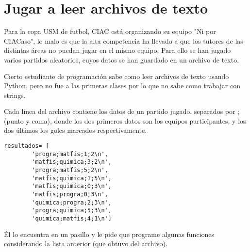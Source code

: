 \section{Jugar a leer archivos de texto}
Para la copa USM de futbol, CIAC está organizando su equipo "Ni por CIACaso", lo malo es que la alta competencia ha llevado a que los tutores de las distintas áreas no puedan jugar en el mismo equipo. Para ello se han jugado varios partidos aleatorios, cuyos datos se han guardado en un archivo de texto.

Cierto estudiante de programación sabe como leer archivos de texto usando Python, pero no fue a las primeras clases por lo que no sabe como trabajar con strings. 

Cada línea del archivo contiene los datos de un partido jugado, separados por ; (punto y coma), donde los dos primeros datos son los equipos participantes, y los dos últimos los goles marcados respectivamente.

\begin{lstlisting}[style=consola]
resultados= [ 	
        'progra;matfis;1;2\n',
        'matfis;quimica;3;2\n',
        'progra;matfis;5;2\n',
        'matfis;quimica;1;5\n',
        'matfis;quimica;0;3\n',
        'matfis;progra;0;3\n',
        'quimica;progra;2;3\n',
        'progra;quimica;5;3\n',
        'quimica;matfis;4;1\n']
\end{lstlisting}

Él lo encuentra en un pasillo y le pide que programe algunas funciones considerando la lista anterior (que obtuvo del archivo).


